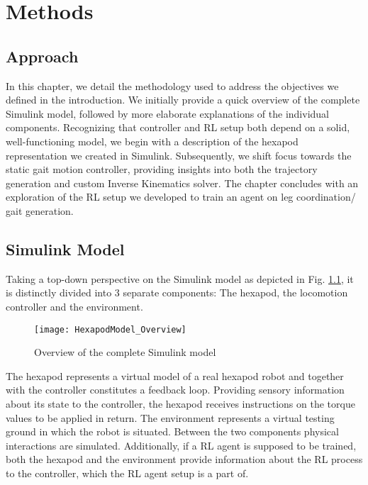 \chapter{Methods}
\label{ch:methods}

\section{Approach}	
In this chapter, we detail the methodology used to address the objectives we defined in the introduction.
We initially provide a quick overview of the complete Simulink model, followed by more elaborate explanations of the individual components.
Recognizing that controller and RL setup both depend on a solid, well-functioning model, we begin with a description of the hexapod representation we created in Simulink.
Subsequently, we shift focus towards the static gait motion controller, providing insights into both the trajectory generation and custom Inverse Kinematics solver.
The chapter concludes with an exploration of the RL setup we developed to train an agent on leg coordination/ gait generation.

\section{Simulink Model}

Taking a top-down perspective on the Simulink model as depicted in Fig. \ref{figure: Simulink Model Overview}, it is distinctly divided into 3 separate components: The hexapod, the locomotion controller and the environment.
\begin{figure}[h!]
	\centerline{\texttt{[image: HexapodModel\_Overview]}}
	\caption[]{Overview of the complete Simulink model}
	\label{figure: Simulink Model Overview}
\end{figure}

The hexapod represents a virtual model of a real hexapod robot and together with the controller constitutes a feedback loop.
Providing sensory information about its state to the controller, the hexapod receives instructions on the torque values to be applied in return.
The environment represents a virtual testing ground in which the robot is situated.
Between the two components physical interactions are simulated.
Additionally, if a RL agent is supposed to be trained, both the hexapod and the environment provide information about the RL process to the controller, which the RL agent setup is a part of.


